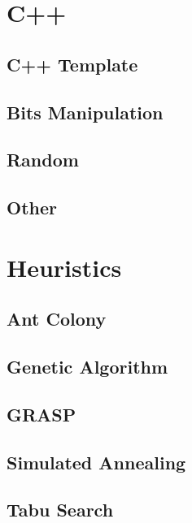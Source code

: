 \section{C++}
\subsection{C++ Template}
\raggedbottom
\hrulefill
\subsection{Bits Manipulation}
\raggedbottom
\hrulefill
\subsection{Random}
\raggedbottom
\hrulefill
\subsection{Other}
\raggedbottom
\hrulefill

\section{Heuristics}
\subsection{Ant Colony}
\raggedbottom
\hrulefill
\subsection{Genetic Algorithm}
\raggedbottom
\hrulefill
\subsection{GRASP}
\raggedbottom
\hrulefill
\subsection{Simulated Annealing}
\raggedbottom
\hrulefill
\subsection{Tabu Search}
\raggedbottom
\hrulefill
